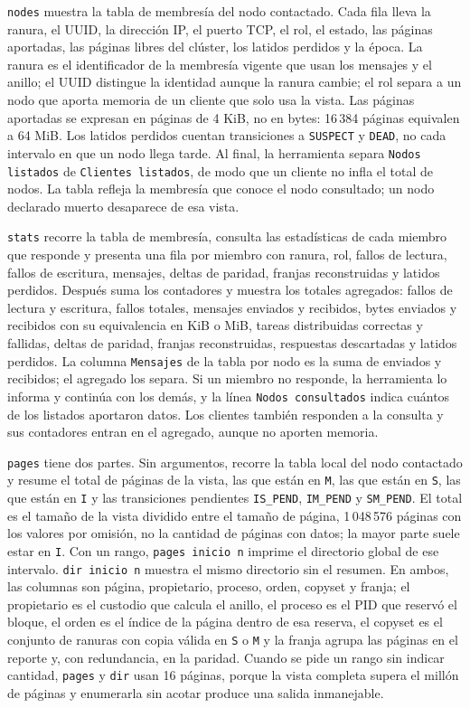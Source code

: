 \texttt{nodes} muestra la tabla de membresía del nodo contactado. Cada fila lleva la ranura, el UUID, la dirección IP, el puerto TCP, el rol, el estado, las páginas aportadas, las páginas libres del clúster, los latidos perdidos y la época. La ranura es el identificador de la membresía vigente que usan los mensajes y el anillo; el UUID distingue la identidad aunque la ranura cambie; el rol separa a un nodo que aporta memoria de un cliente que solo usa la vista. Las páginas aportadas se expresan en páginas de 4 KiB, no en bytes: 16\,384 páginas equivalen a 64 MiB. Los latidos perdidos cuentan transiciones a \texttt{SUSPECT} y \texttt{DEAD}, no cada intervalo en que un nodo llega tarde. Al final, la herramienta separa \texttt{Nodos listados} de \texttt{Clientes listados}, de modo que un cliente no infla el total de nodos. La tabla refleja la membresía que conoce el nodo consultado; un nodo declarado muerto desaparece de esa vista.

\texttt{stats} recorre la tabla de membresía, consulta las estadísticas de cada miembro que responde y presenta una fila por miembro con ranura, rol, fallos de lectura, fallos de escritura, mensajes, deltas de paridad, franjas reconstruidas y latidos perdidos. Después suma los contadores y muestra los totales agregados: fallos de lectura y escritura, fallos totales, mensajes enviados y recibidos, bytes enviados y recibidos con su equivalencia en KiB o MiB, tareas distribuidas correctas y fallidas, deltas de paridad, franjas reconstruidas, respuestas descartadas y latidos perdidos. La columna \texttt{Mensajes} de la tabla por nodo es la suma de enviados y recibidos; el agregado los separa. Si un miembro no responde, la herramienta lo informa y continúa con los demás, y la línea \texttt{Nodos consultados} indica cuántos de los listados aportaron datos. Los clientes también responden a la consulta y sus contadores entran en el agregado, aunque no aporten memoria.

\texttt{pages} tiene dos partes. Sin argumentos, recorre la tabla local del nodo contactado y resume el total de páginas de la vista, las que están en \texttt{M}, las que están en \texttt{S}, las que están en \texttt{I} y las transiciones pendientes \texttt{IS\_PEND}, \texttt{IM\_PEND} y \texttt{SM\_PEND}. El total es el tamaño de la vista dividido entre el tamaño de página, 1\,048\,576 páginas con los valores por omisión, no la cantidad de páginas con datos; la mayor parte suele estar en \texttt{I}. Con un rango, \texttt{pages inicio n} imprime el directorio global de ese intervalo. \texttt{dir inicio n} muestra el mismo directorio sin el resumen. En ambos, las columnas son página, propietario, proceso, orden, copyset y franja; el propietario es el custodio que calcula el anillo, el proceso es el PID que reservó el bloque, el orden es el índice de la página dentro de esa reserva, el copyset es el conjunto de ranuras con copia válida en \texttt{S} o \texttt{M} y la franja agrupa las páginas en el reporte y, con redundancia, en la paridad. Cuando se pide un rango sin indicar cantidad, \texttt{pages} y \texttt{dir} usan 16 páginas, porque la vista completa supera el millón de páginas y enumerarla sin acotar produce una salida inmanejable.

